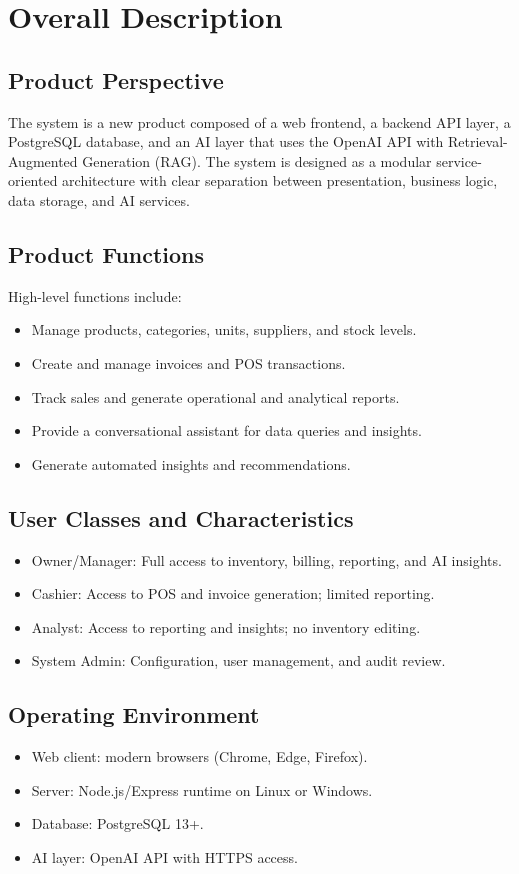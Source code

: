 \section{Overall Description}
\subsection{Product Perspective}
The system is a new product composed of a web frontend, a backend API layer, a PostgreSQL database, and an AI layer that uses the OpenAI API with Retrieval-Augmented Generation (RAG). The system is designed as a modular service-oriented architecture with clear separation between presentation, business logic, data storage, and AI services.

\subsection{Product Functions}
High-level functions include:
\begin{itemize}
    \item Manage products, categories, units, suppliers, and stock levels.
    \item Create and manage invoices and POS transactions.
    \item Track sales and generate operational and analytical reports.
    \item Provide a conversational assistant for data queries and insights.
    \item Generate automated insights and recommendations.
\end{itemize}

\subsection{User Classes and Characteristics}
\begin{itemize}
    \item Owner/Manager: Full access to inventory, billing, reporting, and AI insights.
    \item Cashier: Access to POS and invoice generation; limited reporting.
    \item Analyst: Access to reporting and insights; no inventory editing.
    \item System Admin: Configuration, user management, and audit review.
\end{itemize}

\subsection{Operating Environment}
\begin{itemize}
    \item Web client: modern browsers (Chrome, Edge, Firefox).
    \item Server: Node.js/Express runtime on Linux or Windows.
    \item Database: PostgreSQL 13+.
    \item AI layer: OpenAI API with HTTPS access.
\end{itemize}

